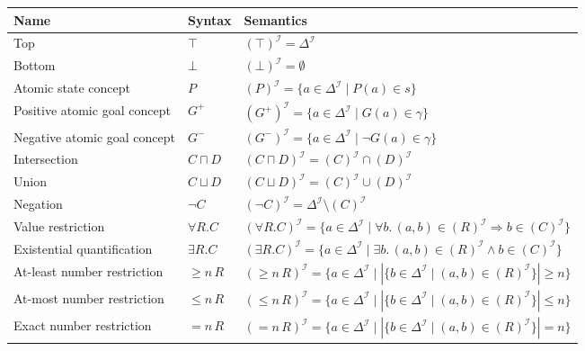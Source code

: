 \documentclass[11pt]{article}
\newcommand{\I}{\mathcal{I}}
\newcommand{\DeltaI}{\Delta^{\I}}
\newcommand{\sem}[1]{\left(#1\right)^{\I}}
\newenvironment{compacttable}
  {\begingroup\setlength{\tabcolsep}{3pt}}
  {\endgroup}
\begin{document}
\begin{compacttable}
\begin{longtable}{>{\raggedright\arraybackslash}p{}
                  >{\centering\arraybackslash}p{}
                  >{\raggedright\arraybackslash}p{}}
\toprule
Name & Syntax & Semantics \\
\midrule
\endhead

Top &
$\top$ &
$\sem{\top} = \DeltaI$ \\

Bottom &
$\bot$ &
$\sem{\bot} = \emptyset$ \\

Atomic state concept &
$P$ &
$\sem{P} = \{ a \in \DeltaI \mid P(a) \in s \}$ \\

Positive atomic goal concept &
$G^+$ &
$\sem{{G^+}} = \{ a \in \DeltaI \mid G(a) \in \gamma \}$ \\

Negative atomic goal concept &
$G^-$ &
$\sem{{G^-}} = \{ a \in \DeltaI \mid \neg G(a) \in \gamma \}$ \\

Intersection &
$C \sqcap D$ &
$\sem{C \sqcap D} = \sem{C} \cap \sem{D}$ \\

Union &
$C \sqcup D$ &
$\sem{C \sqcup D} = \sem{C} \cup \sem{D}$ \\

Negation &
$\neg C$ &
$\sem{\neg C} = \DeltaI \setminus \sem{C}$ \\

Value restriction &
$\forall R.C$ &
$\sem{\forall R.C} = \{ a \in \DeltaI \mid \forall b.\,(a,b)\in\sem{R} \Rightarrow b\in\sem{C} \}$ \\

Existential quantification &
$\exists R.C$ &
$\sem{\exists R.C} = \{ a \in \DeltaI \mid \exists b.\,(a,b)\in\sem{R} \land b\in\sem{C} \}$ \\

At-least number restriction &
$\geq n\,R$ &
$\sem{\geq n\,R} = \{ a \in \DeltaI \mid |\{ b \in \DeltaI \mid (a,b)\in\sem{R} \}| \geq n \}$ \\

At-most number restriction &
$\leq n\,R$ &
$\sem{\leq n\,R} = \{ a \in \DeltaI \mid |\{ b \in \DeltaI \mid (a,b)\in\sem{R} \}| \leq n \}$ \\

Exact number restriction &
$= n\,R$ &
$\sem{= n\,R} = \{ a \in \DeltaI \mid |\{ b \in \DeltaI \mid (a,b)\in\sem{R} \}| = n \}$ \\


\end{longtable}
\end{compacttable}
\end{document}
